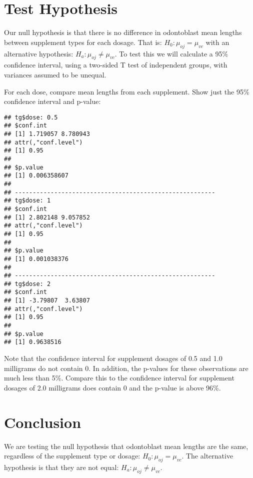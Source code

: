 \documentclass[legalpaper]{article}
\newenvironment{Shaded}{\begin{snugshade}}{\end{snugshade}}
\newcommand{\KeywordTok}[1]{\textcolor[rgb]{0.13,0.29,0.53}{\textbf{{#1}}}}
\newcommand{\StringTok}[1]{\textcolor[rgb]{0.31,0.60,0.02}{{#1}}}
\newcommand{\NormalTok}[1]{{#1}}
\begin{document}
\section{Test Hypothesis}\label{test-hypothesis}

Our null hypothesis is that there is no difference in odontoblast mean
lengths between supplement types for each dosage. That is:
\(H_0 : \mu_{oj} = \mu_{vc}\) with an alternative hypothesis:
\(H_a : \mu_{oj} \ne \mu_{vc}\). To test this we will calculate a 95\%
confidence interval, using a two-sided T test of independent groups,
with variances assumed to be unequal.

For each dose, compare mean lengths from each supplement. Show just the
95\% confidence interval and p-value:

\begin{Shaded}
\end{Shaded}

\begin{verbatim}
## tg$dose: 0.5
## $conf.int
## [1] 1.719057 8.780943
## attr(,"conf.level")
## [1] 0.95
## 
## $p.value
## [1] 0.006358607
## 
## -------------------------------------------------------- 
## tg$dose: 1
## $conf.int
## [1] 2.802148 9.057852
## attr(,"conf.level")
## [1] 0.95
## 
## $p.value
## [1] 0.001038376
## 
## -------------------------------------------------------- 
## tg$dose: 2
## $conf.int
## [1] -3.79807  3.63807
## attr(,"conf.level")
## [1] 0.95
## 
## $p.value
## [1] 0.9638516
\end{verbatim}

Note that the confidence interval for supplement dosages of 0.5 and 1.0
milligrams do not contain 0. In addition, the p-values for these
observations are much less than 5\%. Compare this to the confidence
interval for supplement dosages of 2.0 milligrams does contain 0 and the
p-value is above 96\%.

\section{Conclusion}\label{conclusion}

We are testing the null hypothesis that odontoblast mean lengths are the
same, regardless of the supplement type or dosage:
\(H_0 : \mu_{oj} = \mu_{vc}\). The alternative hypothesis is that they
are not equal: \(H_a : \mu_{oj} \ne \mu_{vc}\).
\end{document}
